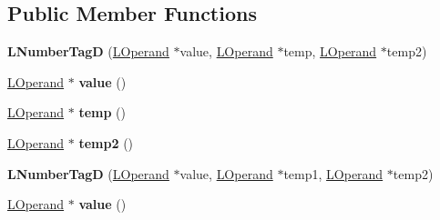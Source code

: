 \subsection*{Public Member Functions}
\begin{DoxyCompactItemize}
\item 
{\bfseries L\+Number\+TagD} (\hyperlink{classv8_1_1internal_1_1_l_operand}{L\+Operand} $\ast$value, \hyperlink{classv8_1_1internal_1_1_l_operand}{L\+Operand} $\ast$temp, \hyperlink{classv8_1_1internal_1_1_l_operand}{L\+Operand} $\ast$temp2)\hypertarget{classv8_1_1internal_1_1_l_number_tag_d_a67088b9bb50a700478235225d9d444e8}{}\label{classv8_1_1internal_1_1_l_number_tag_d_a67088b9bb50a700478235225d9d444e8}

\item 
\hyperlink{classv8_1_1internal_1_1_l_operand}{L\+Operand} $\ast$ {\bfseries value} ()\hypertarget{classv8_1_1internal_1_1_l_number_tag_d_a46629ef102a26f699165889f0cc36f88}{}\label{classv8_1_1internal_1_1_l_number_tag_d_a46629ef102a26f699165889f0cc36f88}

\item 
\hyperlink{classv8_1_1internal_1_1_l_operand}{L\+Operand} $\ast$ {\bfseries temp} ()\hypertarget{classv8_1_1internal_1_1_l_number_tag_d_a2163f8b3c4bd0dbeb6700e6dc18aef2c}{}\label{classv8_1_1internal_1_1_l_number_tag_d_a2163f8b3c4bd0dbeb6700e6dc18aef2c}

\item 
\hyperlink{classv8_1_1internal_1_1_l_operand}{L\+Operand} $\ast$ {\bfseries temp2} ()\hypertarget{classv8_1_1internal_1_1_l_number_tag_d_a775756f64a64d70118275571bcd4469d}{}\label{classv8_1_1internal_1_1_l_number_tag_d_a775756f64a64d70118275571bcd4469d}

\item 
{\bfseries L\+Number\+TagD} (\hyperlink{classv8_1_1internal_1_1_l_operand}{L\+Operand} $\ast$value, \hyperlink{classv8_1_1internal_1_1_l_operand}{L\+Operand} $\ast$temp1, \hyperlink{classv8_1_1internal_1_1_l_operand}{L\+Operand} $\ast$temp2)\hypertarget{classv8_1_1internal_1_1_l_number_tag_d_a41b19202e93cf65ec8f21beaf6a97eba}{}\label{classv8_1_1internal_1_1_l_number_tag_d_a41b19202e93cf65ec8f21beaf6a97eba}

\item 
\hyperlink{classv8_1_1internal_1_1_l_operand}{L\+Operand} $\ast$ {\bfseries value} ()\hypertarget{classv8_1_1internal_1_1_l_number_tag_d_a46629ef102a26f699165889f0cc36f88}{}\label{classv8_1_1internal_1_1_l_number_tag_d_a46629ef102a26f699165889f0cc36f88}


\end{DoxyCompactItemize}
